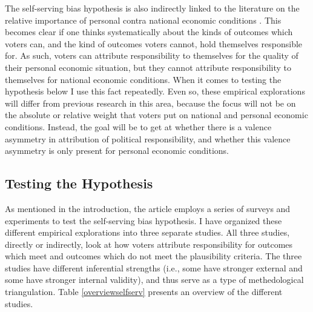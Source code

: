 \documentclass[a4paper,11pt]{article}
\begin{document}
	The self-serving bias hypothesis is also indirectly linked to the literature on the relative importance of personal contra national economic conditions \citep{kinder1979economic,kinder1981sociotropic,singer2013context,stubager2014scope,tilley2017pound}. This becomes clear if one thinks systematically about the kinds of outcomes which voters can, and the kind of outcomes voters cannot, hold themselves responsible for. As such, voters can attribute responsibility to themselves for the quality of their personal economic situation,  but they cannot attribute responsibility to themselves for national economic conditions. When it comes to testing the hypothesis below I use this fact repeatedly. Even so, these empirical explorations will differ from previous research in this area, because the focus will not be on the absolute or relative weight that voters put on national and personal economic conditions. Instead, the goal will be to get at whether there is a valence asymmetry in attribution of political responsibility, and whether this valence asymmetry is only present for personal economic conditions.
	
	
	
	
	\subsection{Testing the Hypothesis}
	
	As mentioned in the introduction, the article employs a series of surveys and experiments to test the self-serving bias hypothesis. I have organized these different empirical explorations into three separate studies. All three studies, directly or indirectly, look at how voters attribute responsibility for outcomes which meet and outcomes which do not meet the plausibility criteria. The three studies have different inferential strengths (i.e., some have stronger external and some have stronger internal validity), and thus serve as a type of methedological triangulation.  Table \ref{overviewselfserv} presents an overview of the different studies.
	
\end{document}
